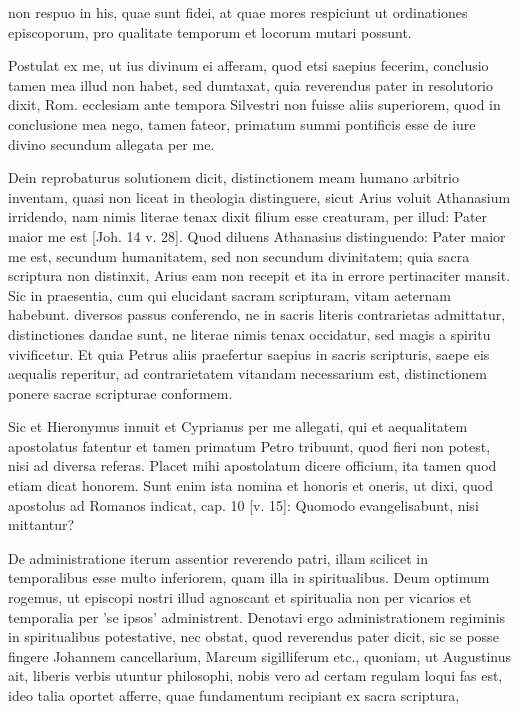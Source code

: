 non respuo in his, quae sunt fidei, at quae mores respiciunt ut ordinationes episcoporum, pro qualitate temporum et locorum mutari possunt.

Postulat ex me, ut ius divinum ei afferam, quod etsi saepius fecerim, conclusio tamen mea illud non habet, sed dumtaxat, quia reverendus pater in resolutorio dixit, Rom. ecclesiam ante tempora Silvestri non fuisse aliis superiorem, quod in conclusione mea nego, tamen fateor, primatum summi pontificis esse de iure divino secundum allegata per me.

Dein reprobaturus solutionem dicit, distinctionem meam humano arbitrio inventam, quasi non liceat in theologia distinguere, sicut Arius voluit Athanasium irridendo, nam nimis literae tenax dixit filium esse creaturam, per illud: Pater maior me est [Joh. 14 v. 28]. Quod diluens Athanasius distinguendo: Pater maior me est, secundum humanitatem, sed non secundum divinitatem; quia sacra scriptura non distinxit, Arius eam non recepit et ita in errore pertinaciter mansit. Sic in praesentia, cum qui elucidant sacram scripturam, vitam aeternam habebunt. diversos passus conferendo, ne in sacris literis contrarietas admittatur, distinctiones dandae sunt, ne literae nimis tenax occidatur, sed magis a spiritu vivificetur. Et quia Petrus aliis praefertur saepius in sacris scripturis, saepe eis aequalis reperitur, ad contrarietatem vitandam necessarium est, distinctionem ponere sacrae scripturae conformem.

Sic et Hieronymus innuit et Cyprianus per me allegati, qui et aequalitatem apostolatus fatentur et tamen primatum Petro tribuunt, quod fieri non potest, nisi ad diversa referas. \marginpar{\small[316]} Placet mihi apostolatum dicere officium, ita tamen quod etiam dicat honorem. Sunt enim ista nomina et honoris et oneris, ut dixi, quod apostolus ad Romanos indicat, cap. 10 [v. 15]: Quomodo evangelisabunt, nisi mittantur?

De administratione iterum assentior reverendo patri, illam scilicet in temporalibus esse multo inferiorem, quam illa in spiritualibus. Deum optimum rogemus, ut episcopi nostri illud agnoscant et spiritualia non per vicarios et temporalia per 'se ipsos' administrent. Denotavi ergo administrationem regiminis in spiritualibus potestative, nec obstat, quod reverendus pater dicit, sic se posse fingere Johannem cancellarium, Marcum sigilliferum etc., quoniam, ut Augustinus ait, liberis verbis utuntur philosophi, nobis vero ad certam regulam loqui fas est, ideo talia oportet afferre, quae fundamentum recipiant ex sacra scriptura,

